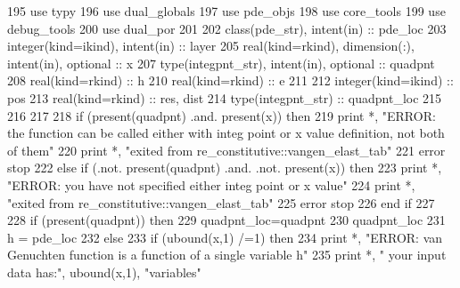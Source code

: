 \begin{DoxyCode}
195       \textcolor{keywordtype}{use }typy
196       \textcolor{keywordtype}{use }dual_globals
197       \textcolor{keywordtype}{use }pde_objs
198       \textcolor{keywordtype}{use }core_tools
199       \textcolor{keywordtype}{use }debug_tools
200       \textcolor{keywordtype}{use }dual_por
201 
202       \textcolor{keywordtype}{class}(pde_str), \textcolor{keywordtype}{intent(in)} :: pde\_loc 
203       \textcolor{keywordtype}{integer(kind=ikind)}, \textcolor{keywordtype}{intent(in)} :: layer
205       \textcolor{keywordtype}{real(kind=rkind)}, \textcolor{keywordtype}{dimension(:)}, \textcolor{keywordtype}{intent(in)}, \textcolor{keywordtype}{optional} :: x
207       \textcolor{keywordtype}{type}(integpnt_str), \textcolor{keywordtype}{intent(in)}, \textcolor{keywordtype}{optional} :: quadpnt
208       \textcolor{keywordtype}{real(kind=rkind)} :: h
210       \textcolor{keywordtype}{real(kind=rkind)} :: e
211 
212       \textcolor{keywordtype}{integer(kind=ikind)} :: pos
213       \textcolor{keywordtype}{real(kind=rkind)} :: res, dist
214       \textcolor{keywordtype}{type}(integpnt_str) :: quadpnt\_loc      
215       
216    
217       
218       \textcolor{keywordflow}{if} (\textcolor{keyword}{present}(quadpnt) .and. \textcolor{keyword}{present}(x)) \textcolor{keywordflow}{then}
219         print *, \textcolor{stringliteral}{"ERROR: the function can be called either with integ point or x value definition, not both
       of them"}
220         print *, \textcolor{stringliteral}{"exited from re\_constitutive::vangen\_elast\_tab"}
221         error stop
222       \textcolor{keywordflow}{else} \textcolor{keywordflow}{if} (.not. \textcolor{keyword}{present}(quadpnt) .and. .not. \textcolor{keyword}{present}(x)) \textcolor{keywordflow}{then}
223         print *, \textcolor{stringliteral}{"ERROR: you have not specified either integ point or x value"}
224         print *, \textcolor{stringliteral}{"exited from re\_constitutive::vangen\_elast\_tab"}
225         error stop
226 \textcolor{keywordflow}{      end if}
227       
228       \textcolor{keywordflow}{if} (\textcolor{keyword}{present}(quadpnt)) \textcolor{keywordflow}{then}
229         quadpnt\_loc=quadpnt
230         quadpnt\_loc%
231         h = pde\_loc%
232       \textcolor{keywordflow}{else}
233         \textcolor{keywordflow}{if} (ubound(x,1) /=1) \textcolor{keywordflow}{then}
234           print *, \textcolor{stringliteral}{"ERROR: van Genuchten function is a function of a single variable h"}
235           print *, \textcolor{stringliteral}{"       your input data has:"}, ubound(x,1), \textcolor{stringliteral}{"variables"}

\end{DoxyCode}
